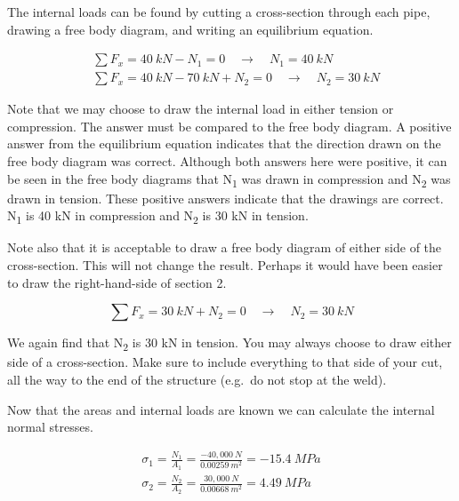 \documentclass[
  letterpaper,
  DIV=11,
  numbers=noendperiod]{scrreprt}
\begin{document}
\begin{tcolorbox}
\begin{tcolorbox}
The internal loads can be found by cutting a cross-section through each
pipe, drawing a free body diagram, and writing an equilibrium equation.

\[
\begin{aligned}
&\sum F_x=40{~kN}-N_1=0 \quad \rightarrow \quad N_1=40{~kN} \\
&\sum F_x=40{~kN}-70{~kN}+N_2=0 \quad \rightarrow \quad N_2=30{~kN}
\end{aligned}
\]

Note that we may choose to draw the internal load in either tension or
compression. The answer must be compared to the free body diagram. A
positive answer from the equilibrium equation indicates that the
direction drawn on the free body diagram was correct. Although both
answers here were positive, it can be seen in the free body diagrams
that N\textsubscript{1} was drawn in compression and N\textsubscript{2}
was drawn in tension. These positive answers indicate that the drawings
are correct. N\textsubscript{1} is 40 kN in compression and
N\textsubscript{2} is 30 kN in tension.

Note also that it is acceptable to draw a free body diagram of either
side of the cross-section. This will not change the result. Perhaps it
would have been easier to draw the right-hand-side of section 2.

\[
\sum F_x=30{~kN}+N_2=0 \quad \rightarrow \quad N_2=30{~kN}
\]

We again find that N\textsubscript{2} is 30 kN in tension. You may
always choose to draw either side of a cross-section. Make sure to
include everything to that side of your cut, all the way to the end of
the structure (e.g.~do not stop at the weld).

Now that the areas and internal loads are known we can calculate the
internal normal stresses.

\[
\begin{gathered}
\sigma_1=\frac{N_1}{A_1}=\frac{-40,000{~N}}{0.00259{~m}^2}=-15.4{~MPa} \\
\sigma_2=\frac{N_2}{A_2}=\frac{30,000{~N}}{0.00668{~m}^2}=4.49{~MPa}
\end{gathered}
\]

\end{tcolorbox}

\end{tcolorbox}
\end{document}
